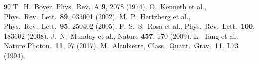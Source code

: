 \documentclass[11pt,a4paper]{article}
\begin{document}
\begin{thebibliography}{99}
 T.~H.~Boyer, Phys.\ Rev.\ A \textbf{9}, 2078 (1974).
 O.~Kenneth et al., Phys.\ Rev.\ Lett.\ \textbf{89}, 033001 (2002).
 M.~P.~Hertzberg et al., Phys.\ Rev.\ Lett.\ \textbf{95}, 250402 (2005).
 F.~S.~S.~Rosa et al., Phys.\ Rev.\ Lett.\ \textbf{100}, 183602 (2008).
 J.~N.~Munday et al., Nature \textbf{457}, 170 (2009).
 L.~Tang et al., Nature Photon.\ \textbf{11}, 97 (2017).
 M.~Alcubierre, Class.\ Quant.\ Grav.\ \textbf{11}, L73 (1994).
\end{thebibliography}
\end{document}
